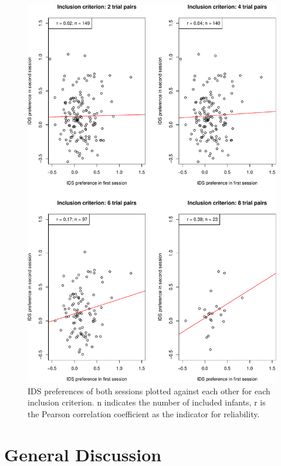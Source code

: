 \documentclass[
  english,
  man,floatsintext]{apa6}
\begin{document}
\begin{figure}

{\centering \includegraphics[width=5in]{Retest_current_draft_files/figure-latex/unnamed-chunk-7-1} 

}

\caption{IDS preferences of both sessions plotted against each other for each inclusion criterion. n indicates the number of included infants, r is the Pearson correlation coefficient as the indicator for reliability.}\label{fig:unnamed-chunk-7}
\end{figure}

\hypertarget{general-discussion}{%
\section{General Discussion}\label{general-discussion}}
\end{document}
